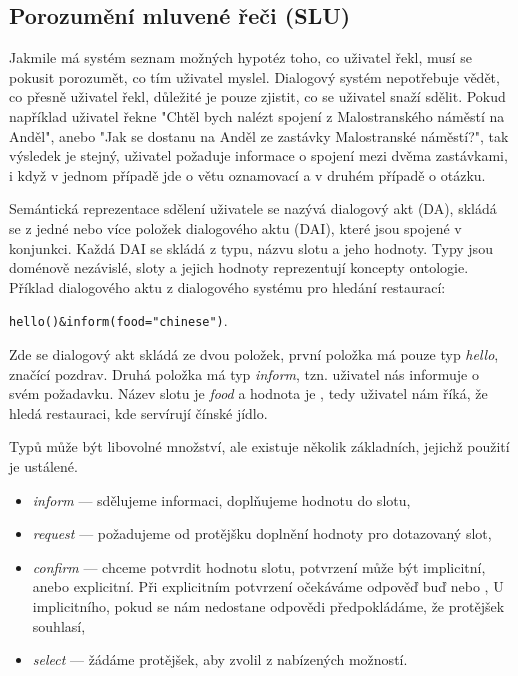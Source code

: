 \subsection{Porozumění mluvené řeči (SLU)}

Jakmile má systém seznam možných hypotéz toho, co uživatel řekl, musí se pokusit porozumět, co tím uživatel myslel.
Dialogový systém nepotřebuje vědět, co přesně uživatel řekl, důležité je pouze zjistit, co se uživatel snaží sdělit.
Pokud například uživatel řekne "Chtěl bych nalézt spojení z Malostranského náměstí na Anděl", anebo "Jak se dostanu na Anděl ze zastávky Malostranské náměstí?", tak výsledek je stejný, uživatel požaduje informace o spojení mezi dvěma zastávkami, i když v jednom případě jde o větu oznamovací a v druhém případě o otázku. 

Semántická reprezentace sdělení uživatele se nazývá dialogový akt (DA), skládá se z jedné nebo více položek dialogového aktu (DAI), které jsou spojené v konjunkci. 
Každá DAI se skládá z typu, názvu slotu a jeho hodnoty. Typy jsou doménově nezávislé, sloty a jejich hodnoty reprezentují koncepty ontologie.
Příklad dialogového aktu z dialogového systému pro hledání restaurací:

\begin{center}
{\tt hello()\&inform(food="chinese")}.
\end{center}

Zde se dialogový akt skládá ze dvou položek, první položka má pouze typ {\em hello}, značící pozdrav. 
Druhá položka má typ {\em inform}, tzn. uživatel nás informuje o svém požadavku.
Název slotu je {\em food} a hodnota je , tedy uživatel nám říká, že hledá restauraci, kde servírují čínské jídlo.

Typů může být libovolné množství, ale existuje několik základních, jejichž použití je ustálené. 
\begin{itemize}
\item {\em inform} --- sdělujeme informaci, doplňujeme hodnotu do slotu,
\item {\em request} --- požadujeme od protějšku doplnění hodnoty pro dotazovaný slot,
\item {\em confirm} --- chceme potvrdit hodnotu slotu, potvrzení může být implicitní, anebo explicitní. 
	Při explicitním potvrzení očekáváme odpověď buď  nebo ,
	U implicitního, pokud se nám nedostane odpovědi předpokládáme, že protějšek souhlasí,
\item {\em select} --- žádáme protějšek, aby zvolil z nabízených možností.
\end{itemize}

